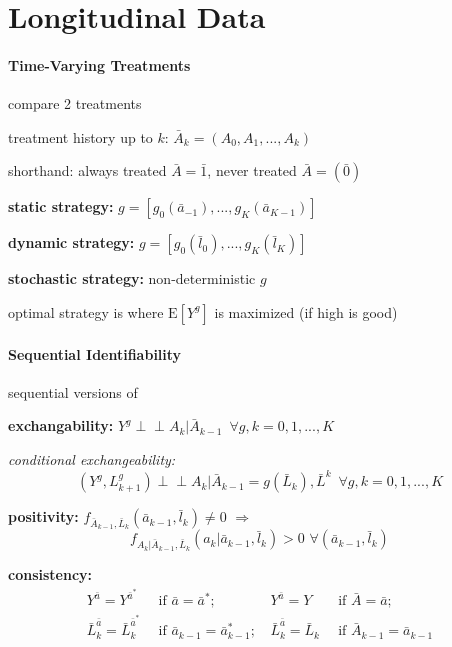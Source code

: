 \documentclass[8pt,oneside]{extarticle}
\newcommand{\indep}{\perp \!\!\! \perp}
\begin{document}
\section{Longitudinal Data}
\begin{multicols}{2}

\paragraph{\large Time-Varying Treatments} compare 2 treatments

\noindent treatment history up to $k$: $\bar{A}_k=(A_0, A_1, ..., A_k)$

\noindent shorthand: always treated $\bar{A} = \bar{1}$, never treated $\bar{A} = \left(\bar{0}\right)$

\textbf{static strategy:} $g=\left[g_0(\bar{a}_{-1}), ..., g_K(\bar{a}_{K-1})\right]$

\textbf{dynamic strategy:} $g=\left[g_0(\bar{l}_0), ..., g_K(\bar{l}_K)\right]$

\textbf{stochastic strategy:} non-deterministic $g$

\noindent optimal strategy is where $\mathrm{E}\left[Y^g\right]$ is maximized (if high is good)






\paragraph{\large Sequential Identifiability} sequential versions of

 \textbf{exchangability:}
$Y^g \indep A_k| \bar{A}_{k-1} \,\,\, \forall g, k=0,1,...,K$

\textit{conditional exchangeability:}
$$\left(Y^g, L^g_{k+1}\right) \indep A_k| \bar{A}_{k-1} {=} g\left(\bar{L}_k\right), \bar{L}^k \,\,\, \forall g, k=0,1,...,K$$

 \textbf{positivity:} $f_{\bar{A}_{k-1},\bar{L}_k}(\bar{a}_{k-1},\bar{l}_k)\neq 0 \,\, \Rightarrow$
$$ f_{A_k|\bar{A}_{k-1},\bar{L}_k}(a_k|\bar{a}_{k-1},\bar{l}_k)>0 \,\, \forall \left(\bar{a}_{k-1},\bar{l}_k\right)$$

 \textbf{consistency:} 
\begin{align*}
Y^{\bar{a}} = Y^{\bar{a}^*} & \, \text{ if } {\bar{a}} = {\bar{a}^*};  & \,
Y^{\bar{a}} = Y & \, \text{ if } {\bar{A}} = {\bar{a}};  \\
\bar{L}^{\bar{a}}_k = \bar{L}^{\bar{a}^*}_k & \, \text{ if } {\bar{a}_{k-1}} = {\bar{a}^*_{k-1}}; & \,
\bar{L}^{\bar{a}}_k = \bar{L}_k & \, \text{ if } {\bar{A}_{k-1}} = {\bar{a}_{k-1}}
\end{align*}



\end{multicols}
\end{document}
